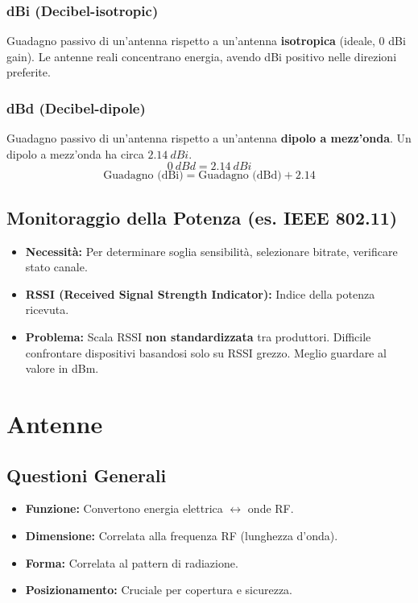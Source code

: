 \documentclass{article}
\begin{document}
\subsubsection{dBi (Decibel-isotropic)}
Guadagno passivo di un'antenna rispetto a un'antenna \textbf{isotropica} (ideale, 0 dBi gain). Le antenne reali concentrano energia, avendo dBi positivo nelle direzioni preferite.

\subsubsection{dBd (Decibel-dipole)}
Guadagno passivo di un'antenna rispetto a un'antenna \textbf{dipolo a mezz'onda}.
Un dipolo a mezz'onda ha circa $\SI{2.14}{dBi}$.
\[ \SI{0}{dBd} = \SI{2.14}{dBi} \]
\[ \text{Guadagno (dBi)} = \text{Guadagno (dBd)} + 2.14 \]

\subsection{Monitoraggio della Potenza (es. IEEE 802.11)}
\begin{itemize}
    \item \textbf{Necessità:} Per determinare soglia sensibilità, selezionare bitrate, verificare stato canale.
    \item \textbf{RSSI (Received Signal Strength Indicator):} Indice della potenza ricevuta.
    \item \textbf{Problema:} Scala RSSI \textbf{non standardizzata} tra produttori. Difficile confrontare dispositivi basandosi solo su RSSI grezzo. Meglio guardare al valore in dBm.
\end{itemize}

\section{Antenne}

\subsection{Questioni Generali}
\begin{itemize}
    \item \textbf{Funzione:} Convertono energia elettrica $\leftrightarrow$ onde RF.
    \item \textbf{Dimensione:} Correlata alla frequenza RF (lunghezza d'onda).
    \item \textbf{Forma:} Correlata al pattern di radiazione.
    \item \textbf{Posizionamento:} Cruciale per copertura e sicurezza.
\end{itemize}
\end{document}
